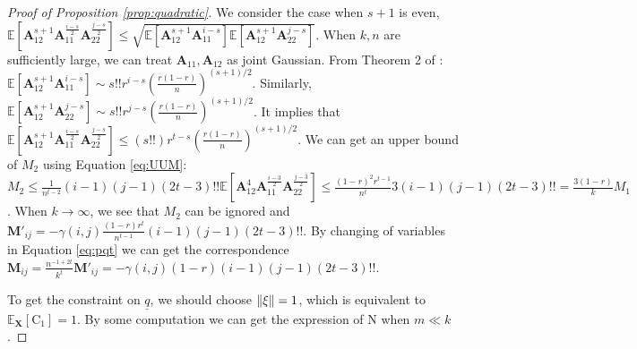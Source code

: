 \documentclass[conference]{IEEEtran}
\DeclarePairedDelimiter\norm{\lVert}{\rVert}
\def\E{\mathbb{E}}
\newcommand{\ide}[2]{ \gamma(#1,#2) }
\begin{document}
\begin{proof}[Proof of Proposition \ref{prop:quadratic}]
We consider the case when $s+1$ is even, $\E[\bm{A}_{12}^{s+1} \bm{A}_{11}^{\frac{i - s}{2}}\bm{A}_{22}^{\frac{j - s}{2}}] \leq \sqrt{\E[\bm{A}_{12}^{s+1}\bm{A}_{11}^{i-s}]\E[\bm{A}_{12}^{s+1}\bm{A}_{22}^{j-s}]}$. When $k, n$ are sufficiently large, we can treat $\bm{A}_{11}, \bm{A}_{12}$ as joint Gaussian. From Theorem 2 of \cite{multivariateBeta}: $\E[\bm{A}_{12}^{s+1}\bm{A}_{11}^{i-s}] \sim s!! r^{i-s}(\frac{r(1-r)}{n})^{(s+1)/2}$. Similarly, $\E[\bm{A}_{12}^{s+1}\bm{A}_{22}^{j-s}] \sim s!! r^{j-s}(\frac{r(1-r)}{n})^{(s+1)/2}$. It implies that $\E[\bm{A}_{12}^{s+1} \bm{A}_{11}^{\frac{i - s}{2}}\bm{A}_{22}^{\frac{j - s}{2}}] \leq (s!!) r^{t-s}(\frac{r(1-r)}{n})^{(s+1)/2}$. We can get an upper bound of $M_2$ using Equation \ref{eq:UUM}: $M_2 \leq \frac{1}{n^{t-2}} (i-1)(j-1)(2t-3)!!\E[\bm{A}_{12}^{4} \bm{A}_{11}^{\frac{i - 3}{2}}\bm{A}_{22}^{\frac{j - 3}{2}}] \leq \frac{(1-r)^2 r^{t-1}}{n^t}3(i-1)(j-1)(2t-3)!!= \frac{3(1-r)}{k} M_1$.
When $k \to \infty$, we see that $M_2$ can be ignored and $\mathbf{M}'_{ij} = -\ide{i}{j}\frac{(1-r)r^t}{n^{t-1}}(i-1)(j-1)(2t-3)!!$. By changing of variables in Equation \ref{eq:pqt} we can get the correspondence $\mathbf{M}_{ij} = \frac{n^{-1+2t}}{k^t} \mathbf{M}'_{ij} = -\ide{i}{j}(1-r)(i-1)(j-1)(2t-3)!!$. 

To get the constraint on $\underline{q}$, we should choose $\norm{\xi} = 1$, which is equivalent to $\E_{\bm{X}}[\mathrm{C}_1] = 1$. By some computation we can get the expression of $\mathrm{N}$ when $ m \ll k$.

\end{proof}
\end{document}
